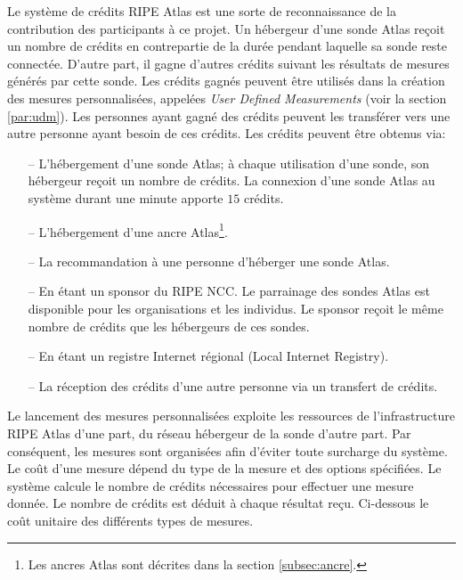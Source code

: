 Le système de crédits RIPE Atlas est une sorte de reconnaissance de la contribution des participants à ce projet. Un hébergeur d'une sonde  Atlas reçoit un nombre de crédits en contrepartie de la durée pendant laquelle sa sonde reste connectée. D'autre part, il gagne d'autres crédits suivant les résultats de mesures générés par cette sonde. Les crédits gagnés peuvent être utilisés dans la création des mesures personnalisées, appelées  \textit{User Defined Measurements} (voir la section \ref{par:udm}). Les personnes ayant gagné des crédits peuvent les transférer vers une autre personne ayant besoin de ces crédits. Les crédits peuvent être obtenus via:
\begin{itemize}
	\item[--] L'hébergement d'une sonde Atlas; à chaque utilisation d'une sonde, son hébergeur reçoit un nombre de crédits.  La connexion d'une sonde  Atlas au système durant une minute apporte $15$ crédits.
	\item[--] L'hébergement d'une ancre  Atlas\footnote{Les ancres Atlas sont décrites dans  la section \ref{subsec:ancre}.}.
	\item[--] La recommandation à une personne d'héberger une sonde  Atlas.
	\item[--] En étant un sponsor du RIPE NCC. Le parrainage des sondes Atlas est disponible pour les organisations et les individus.  Le sponsor reçoit le même nombre de crédits que les hébergeurs de ces sondes.
	\item[--] En étant  un  registre Internet régional (Local Internet Registry).
	\item[--] La réception des crédits d'une autre personne via un transfert de crédits.
\end{itemize}

Le lancement des mesures personnalisées exploite les ressources de l'infrastructure RIPE Atlas d'une part,  du réseau hébergeur de la sonde d'autre part. Par conséquent, les mesures sont organisées afin d'éviter toute surcharge du système. Le coût d'une  mesure dépend du type de la mesure et des options spécifiées. Le système calcule le nombre de crédits nécessaires pour effectuer une mesure donnée. Le nombre de crédits est déduit à chaque résultat reçu.  Ci-dessous le coût unitaire des différents types de mesures.

